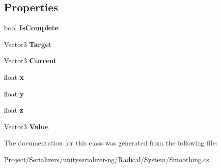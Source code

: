 \subsection*{Properties}
\begin{DoxyCompactItemize}
\item 
\mbox{\label{class_radical_library_1_1_smooth_vector3_ac0e49009ea614c37602e2a7f0ca32240}} 
bool {\bfseries Is\+Complete}
\item 
\mbox{\label{class_radical_library_1_1_smooth_vector3_ae6e1a0824db52df7aa5a66c0c0465a01}} 
Vector3 {\bfseries Target}
\item 
\mbox{\label{class_radical_library_1_1_smooth_vector3_aba5ed506be16cf21472bd9921702cd5d}} 
Vector3 {\bfseries Current}
\item 
\mbox{\label{class_radical_library_1_1_smooth_vector3_aabe4b65f544a412a094492a045056b74}} 
float {\bfseries x}
\item 
\mbox{\label{class_radical_library_1_1_smooth_vector3_ac744758c88420820e1839ada11ae60ac}} 
float {\bfseries y}
\item 
\mbox{\label{class_radical_library_1_1_smooth_vector3_accb3594d643d55a1edfde5c957602914}} 
float {\bfseries z}
\item 
\mbox{\label{class_radical_library_1_1_smooth_vector3_a6ef6199f8868c5a4a04e3186dc8f6ca7}} 
Vector3 {\bfseries Value}
\end{DoxyCompactItemize}


The documentation for this class was generated from the following file\+:\begin{DoxyCompactItemize}
\item 
Project/\+Serializers/unityserializer-\/ng/\+Radical/\+System/Smoothing.\+cs\end{DoxyCompactItemize}
